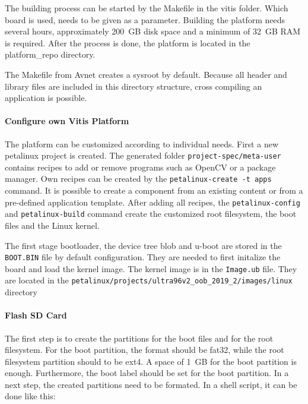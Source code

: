 The building process can be started by the Makefile in the vitis folder.
Which board is used, needs to be given as a parameter.
Building the platform needs several hours, approximately \SI{200}{GB} disk space and a minimum of \SI{32}{GB} RAM is required.
After the process is done, the platform is located in the platform\_repo directory.

The Makefile from Avnet creates a sysroot by default.
Because all header and library files are included in this directory structure, cross compiling an application is possible.

\paragraph{Configure own Vitis Platform}
The platform can be customized according to individual needs.
First a new petalinux project is created.
The generated folder \texttt{project-spec/meta-user} contains recipes to add or remove programs such as OpenCV or a package manager.
Own recipes can be created by the \texttt{petalinux-create -t apps} command.
It is possible to create a component from an existing content or from a pre-defined application template.
After adding all recipes, the \texttt{petalinux-config} and \texttt{petalinux-build} command create the customized root filesystem, the boot files and the Linux kernel. %

The first stage bootloader, the device tree blob and u-boot are stored in the \texttt{BOOT.BIN} file by default configuration.
They are needed to first initalize the board and load the kernel image. %
The kernel image is in the \texttt{Image.ub} file. %
They are located in the \texttt{petalinux/projects/ultra96v2\_oob\_2019\_2/images/linux} directory

\paragraph{Flash SD Card}
The first step is to create the partitions for the boot files and for the root filesystem.
For the boot partition, the format should be fat32, while the root filesystem partition should to be ext4.
A space of \SI{1}{GB} for the boot partition is enough.
Furthermore, the boot label should be set for the boot partition.
In a next step, the created partitions need to be formated.
In a shell script, it can be done like this:

